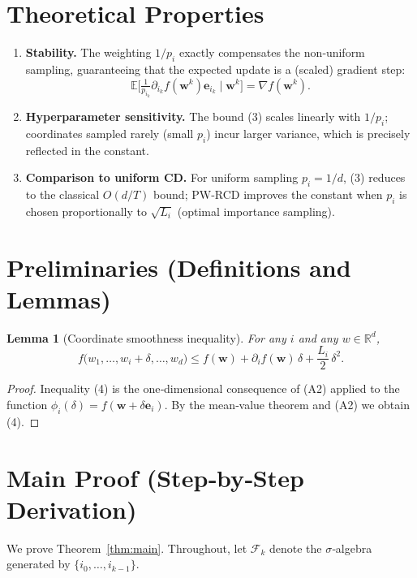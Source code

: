 \documentclass{article}
\newtheorem{lemma}{Lemma}
\newcommand{\E}{\mathbb{E}}
\newcommand{\R}{\mathbb{R}}
\begin{document}
\section*{Theoretical Properties}
\begin{enumerate}[label=\arabic*.]
\item \textbf{Stability.} The weighting $1/p_i$ exactly compensates the non‑uniform sampling, guaranteeing that the expected update is a (scaled) gradient step:
\[
\E\!\bigl[\tfrac{1}{p_{i_k}}\partial_{i_k}f(\bm w^{k})\bm e_{i_k}\mid\bm w^{k}\bigr]=\nabla f(\bm w^{k}).
\]
\item \textbf{Hyperparameter sensitivity.} The bound (3) scales linearly with $1/p_i$; coordinates sampled rarely (small $p_i$) incur larger variance, which is precisely reflected in the constant.
\item \textbf{Comparison to uniform CD.} For uniform sampling $p_i=1/d$, (3) reduces to the classical $O(d/T)$ bound; PW‑RCD improves the constant when $p_i$ is chosen proportionally to $\sqrt{L_i}$ (optimal importance sampling).
\end{enumerate}

\section*{Preliminaries (Definitions and Lemmas)}
\begin{lemma}[Coordinate smoothness inequality]\label{lem:smooth}
For any $i$ and any $w\in\R^{d}$,
\[
f\bigl(w_{1},\dots ,w_{i}+\delta,\dots ,w_{d}\bigr)
\le f(\bm w)+\partial_i f(\bm w)\,\delta+\frac{L_i}{2}\,\delta^{2}.
\tag{4}
\]
\end{lemma}
\begin{proof}
Inequality (4) is the one‑dimensional consequence of (A2) applied to the function
$\phi_i(\delta)=f(\bm w+\delta\bm e_i)$. By the mean‑value theorem and (A2) we obtain (4). \hfill\qedsymbol
\end{proof}

\section*{Main Proof (Step‑by‑Step Derivation)}
We prove Theorem~\ref{thm:main}. Throughout, let $\mathcal{F}_k$ denote the $\sigma$‑algebra generated by $\{i_0,\dots ,i_{k-1}\}$.
\end{document}
